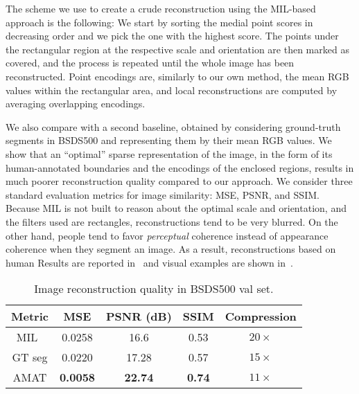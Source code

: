 \documentclass[10pt,twocolumn,letterpaper]{article}
\begin{document}
The scheme we use to create a crude reconstruction using the MIL-based approach is the following:
We start by sorting the medial point scores in decreasing order and we pick the one with the highest score.
The points under the rectangular region at the respective scale and orientation are then marked as covered,
and the process is repeated until the whole image has been reconstructed.
Point encodings are, similarly to our own method, the mean RGB values within the rectangular area, 
and local reconstructions are computed by averaging overlapping encodings.

We also compare with a second baseline, obtained by considering ground-truth segments in BSDS500
and representing them by their mean RGB values.
We show that an ``optimal'' sparse representation of the image, in the form of its human-annotated
boundaries and the encodings of the enclosed regions, results in much poorer reconstruction
quality compared to our approach.
We consider three standard evaluation metrics for image similarity: MSE, PSNR, and SSIM.
Because MIL is not built to reason about the optimal scale and orientation, and the filters used are rectangles,
reconstructions tend to be very blurred.
On the other hand, people tend to favor \emph{perceptual} coherence instead of appearance coherence
when they segment an image.
As a result, reconstructions based on human
Results are reported in~ and visual examples are shown
in~.


\begin{table}
\centering
\begin{tabular}{|c|c|c|c|c|}
\hline
Metric	&	MSE		&	PSNR (dB)	&	SSIM	&	Compression 	\\
\hline
MIL~\cite{tsogkas2012learning}	&	0.0258	& 	16.6 	& 	0.53	&	$20\times$	\\
\hline
GT seg &	0.0220	& 	17.28 	& 	0.57	&	$15\times$\\
\hline
AMAT	&	\textbf{0.0058}	&	\textbf{22.74}	&	\textbf{0.74}	&	$11\times$	\\
\hline
\end{tabular}
\caption{Image reconstruction quality in BSDS500 val set.}
\label{tab:experiments:reconstruction}
\end{table}
\end{document}
